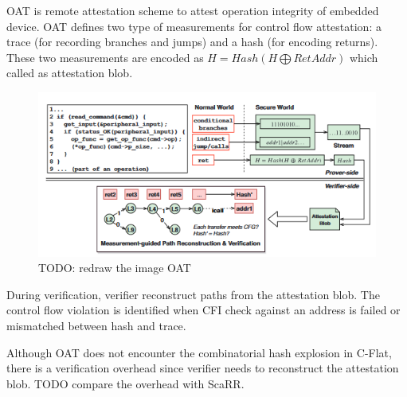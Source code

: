 OAT \cite{sunOATAttestingOperation2020} is remote attestation scheme to attest operation integrity of embedded device. OAT defines two type of measurements for control flow attestation: a trace (for recording branches and jumps) and a hash (for encoding returns). These two measurements are encoded as $H = Hash(H \bigoplus RetAddr)$ which called as attestation blob.

\begin{figure}[htbp]
\centerline{\includegraphics[scale=.5]{Figures/01/oat.png}}
\caption{TODO: redraw the image OAT}
\label{fig:oat}
\end{figure}

During verification, verifier reconstruct paths from the attestation blob. The control flow violation is identified when CFI check against an address is failed or mismatched between hash and trace.

Although OAT does not encounter the combinatorial hash explosion in C-Flat, there is a verification overhead since verifier needs to reconstruct the attestation blob. TODO compare the overhead with ScaRR.
